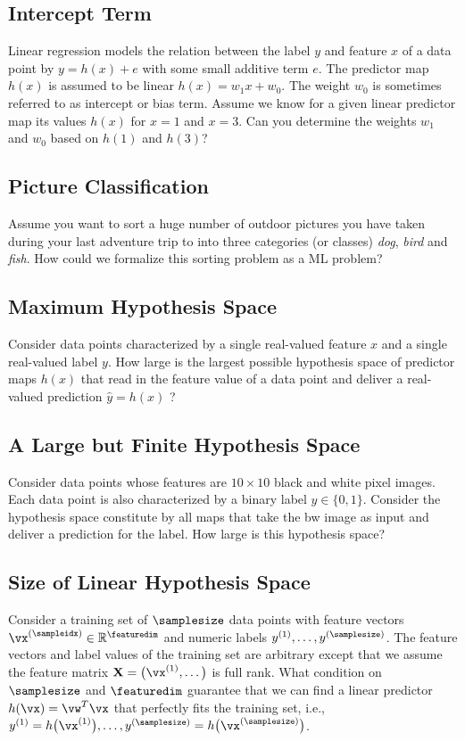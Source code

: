 \documentclass[12pt]{report}
\newcommand{\featurelen}{\featuredim}
\begin{document}
 \subsection{Intercept Term}
 \label{ex_2_5}
 Linear regression models the relation between the label $y$ and feature $x$ of 
 a data point by $y = h(x) + e$ with some small additive term $e$. The predictor 
 map $h(x)$ is assumed to be linear $h(x) =w_1 x + w_0$. The weight $w_{0}$ is 
 sometimes referred to as intercept or bias term. Assume we know for a given 
 linear predictor map its values $h(x)$ for $x=1$ and $x=3$. Can you determine 
 the weights $w_{1}$ and $w_{0}$ based on $h(1)$ and $h(3)$?
 
 \subsection{Picture Classification} 
 \label{ex_2_6}
Assume you want to sort a huge number of outdoor 
pictures you have taken during your last adventure 
trip to into three categories (or classes) \emph{dog}, 
\emph{bird} and \emph{fish}. How could we formalize 
this sorting problem as a ML problem? 

 \subsection{Maximum Hypothesis Space} 
\label{ex_2_7}
Consider data points characterized by a single real-valued 
feature $x$ and a single real-valued label $y$. How large 
is the largest possible hypothesis space of predictor maps 
$h(x)$ that read in the feature value of a data point and 
deliver a real-valued prediction $\hat{y}=h(x)$ ? 

 \subsection{A Large but Finite Hypothesis Space} 
\label{ex_2_8}
Consider data points whose features are $10 \times 10$ black and white pixel images. 
Each data point is also characterized by a binary label $y \in \{0,1\}$. Consider the 
hypothesis space constitute by all maps that take the bw image as input and deliver 
a prediction for the label. How large is this hypothesis space? 

\subsection{Size of Linear Hypothesis Space} 
\label{ex_size_lin_hypospace} 
Consider a training set of $\samplesize$ data points with feature 
vectors $\vx^{(\sampleidx)} \in \mathbb{R}^{\featuredim}$ and 
numeric labels $y^{(1)},\ldots,y^{(\samplesize)}$. The feature vectors 
and label values of the training set are arbitrary except that we assume 
the feature matrix $\mathbf{X} = \big(\vx^{(1)},\ldots \big)$ is full rank. 
What condition on $\samplesize$ and $\featurelen$ guarantee that we 
can find a linear predictor $h(\vx) = \vw^{T} \vx$ that perfectly fits the 
training set, i.e., $y^{(1)} = h\big(\vx^{(1)} \big),\ldots, y^{(\samplesize)} = h\big(\vx^{(\samplesize)} \big)$. 
\end{document}
